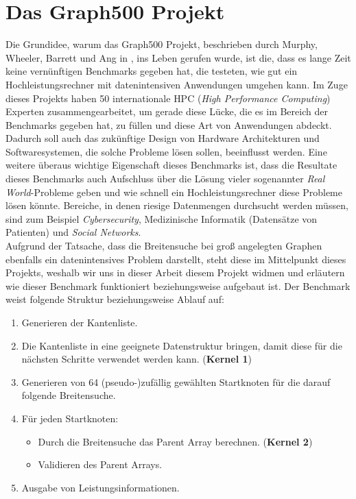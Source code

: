 \documentclass[11pt,a4paper]{article}
\begin{document}
\section{Das Graph500 Projekt}
\label{sec:graph500}
Die Grundidee, warum das Graph500 Projekt, beschrieben durch Murphy, Wheeler, Barrett und Ang in \cite{graph500}, ins Leben gerufen wurde, ist die, dass es lange Zeit keine vernünftigen Benchmarks gegeben hat, die testeten, wie gut ein Hochleistungsrechner mit datenintensiven Anwendungen umgehen kann. Im Zuge dieses Projekts haben 50 internationale HPC (\textit{High Performance Computing}) Experten zusammengearbeitet, um gerade diese Lücke, die es im Bereich der Benchmarks gegeben hat, zu füllen und diese Art von Anwendungen abdeckt. Dadurch soll auch das zukünftige Design von Hardware Architekturen und Softwaresystemen, die solche Probleme lösen sollen, beeinflusst werden. Eine weitere überaus wichtige Eigenschaft dieses Benchmarks ist, dass die Resultate dieses Benchmarks auch Aufschluss über die Lösung vieler sogenannter \textit{Real World}-Probleme geben und wie schnell ein Hochleistungsrechner diese Probleme lösen könnte. Bereiche, in denen riesige Datenmengen durchsucht werden müssen, sind zum Beispiel \textit{Cybersecurity}, Medizinische Informatik (Datensätze von Patienten) und \textit{Social Networks}.\\
Aufgrund der Tatsache, dass die Breitensuche bei groß angelegten Graphen ebenfalls ein datenintensives Problem darstellt, steht diese im Mittelpunkt dieses Projekts, weshalb wir uns in dieser Arbeit diesem Projekt widmen und erläutern wie dieser Benchmark funktioniert beziehungsweise aufgebaut ist. Der Benchmark weist folgende Struktur beziehungsweise Ablauf auf:
\begin{enumerate} 
\item{Generieren der Kantenliste.}
\item{Die Kantenliste in eine geeignete Datenstruktur bringen, damit diese für die nächsten Schritte verwendet werden kann. (\textbf{Kernel 1})}
\item{Generieren von 64 (pseudo-)zufällig gewählten Startknoten für die darauf folgende Breitensuche.}
\item{Für jeden Startknoten:}
\begin{itemize}
         \item Durch die Breitensuche das Parent Array berechnen.  (\textbf{Kernel 2})
         \item Validieren des Parent Arrays.
      \end{itemize}
\item{Ausgabe von Leistungsinformationen.}
\end{enumerate}
\end{document}

